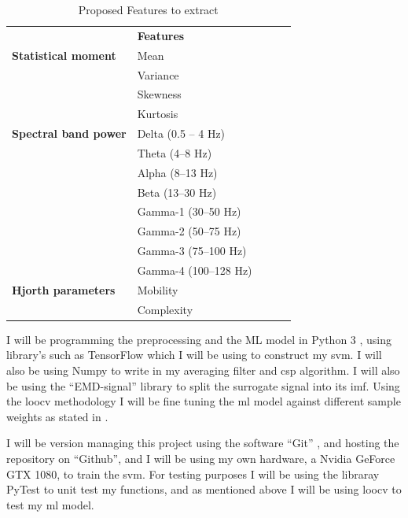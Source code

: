 \documentclass[12pt]{article}
\begin{document}
\begin{table}[H]
\centering
\begin{tabular}{lllll}
                             & \textbf{Features}    &  &  &  \\
\textbf{Statistical moment}  & Mean                 &  &  &  \\
                             & Variance             &  &  &  \\
                             & Skewness             &  &  &  \\
                             & Kurtosis             &  &  &  \\
\textbf{Spectral band power} & Delta (0.5 – 4 Hz)   &  &  &  \\
                             & Theta (4–8 Hz)       &  &  &  \\
                             & Alpha (8–13 Hz)      &  &  &  \\
                             & Beta (13–30 Hz)      &  &  &  \\
                             & Gamma-1 (30–50 Hz)   &  &  &  \\
                             & Gamma-2 (50–75 Hz)   &  &  &  \\
                             & Gamma-3 (75–100 Hz)  &  &  &  \\
                             & Gamma-4 (100–128 Hz) &  &  &  \\
\textbf{Hjorth parameters}   & Mobility             &  &  &  \\
                             & Complexity           &  &  & 
\end{tabular}
\caption{Proposed Features to extract}
\end{table}

I will be programming the preprocessing and the ML model in Python 3 \cite{python3}, using library's such as TensorFlow \cite{tensorflow2015-whitepaper} which I will be using to construct my \acrshort{svm}. I will also be using Numpy \cite{harris2020array} to write in my averaging filter and \acrshort{csp} algorithm. I will also be using the ``EMD-signal'' library \cite{pyemd} to split the surrogate signal into its \acrshort{imf}. Using the \acrfull{loocv} methodology I will be fine tuning the \acrshort{ml} model against different sample weights as stated in \cite{gao2022general}. 

I will be version managing this project using the software ``Git'' , and hosting the repository on ``Github'', and I will be using my own hardware, a Nvidia GeForce GTX 1080, to train the \acrshort{svm}. For testing purposes I will be using the libraray PyTest to unit test my functions, and as mentioned above I will be using \acrshort{loocv} to test my \acrshort{ml} model.
\end{document}
